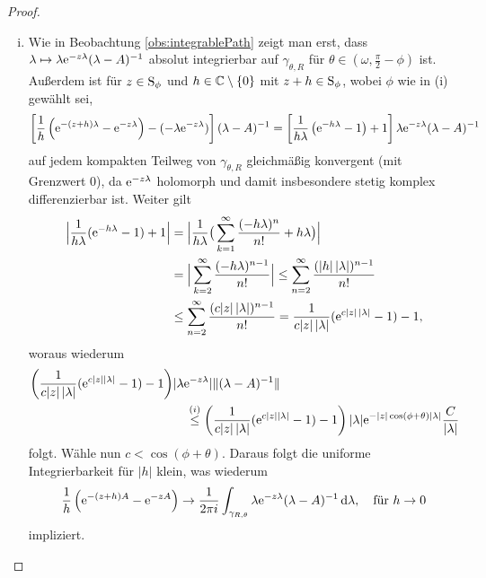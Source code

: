 \begin{proof}
\begin{enumerate}[(i)]
    \item Wie in Beobachtung \ref{obs:integrablePath} zeigt man erst, dass $\lambda \mapsto \lambda \mathrm{e}^{-z\lambda}(\lambda - A)^{-1}$ absolut integrierbar auf $\gamma_{\theta,R}$ für $\theta \in (\omega, \frac{\pi}{2} - \phi)$ ist.
      Außerdem ist für $z \in \mathrm{S}_\phi$ und $h \in \mathbb{C}\setminus\{0\}$ mit $z + h \in \mathrm{S}_\phi$, wobei $\phi$ wie in (i) gewählt sei, 
      $$
      \left[ \frac{1}{h} \left( \mathrm{e}^{-(z + h)\lambda} - \mathrm{e}^{-z\lambda} \right) - (- \lambda \mathrm{e}^{-z\lambda}) \right] (\lambda - A)^{-1}
      = \left[ \frac{1}{h\lambda} \left( \mathrm{e}^{-h\lambda} - 1\right) + 1\right] \lambda \mathrm{e}^{-z\lambda}  (\lambda - A)^{-1}
      $$
      auf jedem kompakten Teilweg von $\gamma_{\theta,R}$ gleichmäßig konvergent (mit Grenzwert 0), da $\mathrm{e}^{-z\lambda}$ holomorph und damit insbesondere stetig komplex differenzierbar ist.
      Weiter gilt
      \begin{align*}
        \Big| \frac{1}{h\lambda} (\mathrm{e}^{-h\lambda} - 1) + 1 \Big|
        &= \Big| \frac{1}{h\lambda} \big(\sum_{k = 1}^\infty \frac{(-h\lambda)^{n}}{n!} + h\lambda \big) \Big| \\
        &= \Big| \sum_{k = 2}^\infty \frac{(-h \lambda)^{n - 1}}{n!} \Big|
        \leq \sum_{n = 2}^\infty \frac{(|h| \, |\lambda|)^{n - 1}}{n!} \\
        &\leq \sum_{n = 2}^\infty \frac{(c |z| \, |\lambda|)^{n - 1}}{n!}
        = \frac{1}{c|z|\, |\lambda|} (\mathrm{e}^{c|z|\,|\lambda|} - 1) - 1,
      \end{align*}
      woraus wiederum
      \begin{align*}
        \left( \frac{1}{c |z|\, |\lambda|} (\mathrm{e}^{c |z| |\lambda|} - 1) - 1 \right) & | \lambda \mathrm{e}^{-z\lambda} | \| (\lambda - A)^{-1} \| \\
        &\quad\overset{(i)}{\leq} \left( \frac{1}{c |z|\, |\lambda|} (\mathrm{e}^{c |z| |\lambda|} - 1) - 1 \right) | \lambda| \mathrm{e}^{-|z|\cos(\phi + \theta) |\lambda|} \frac{C}{|\lambda|}
      \end{align*}
      folgt.
      Wähle nun $c < \cos(\phi + \theta)$.
      Daraus folgt die uniforme Integrierbarkeit für $|h|$ klein, was wiederum
      $$
      \frac{1}{h} \left(\mathrm{e}^{-(z + h)A} - \mathrm{e}^{-zA} \right) \to 
      \frac{1}{2\pi i} \int_{\gamma_{R, \theta}} \lambda \mathrm{e}^{-z\lambda}(\lambda - A)^{-1} \, {\operatorname{d}\!{\lambda}}, \quad\text{für } h \to 0
      $$
      impliziert.


\end{enumerate}
\end{proof}
